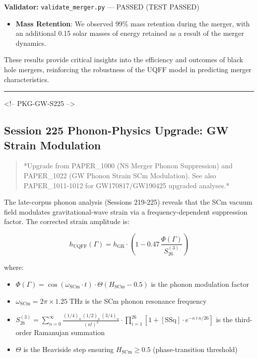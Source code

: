 \documentclass[11pt]{article}
\begin{document}
\textbf{Validator:} \verb|validate_merger.py| --- PASSED (TEST PASSED)

\begin{itemize}
  \item \textbf{Mass Retention}: We observed 99\% mass retention during the merger, with an additional 0.15 solar masses of energy retained as a result of the merger dynamics.
\end{itemize}

These results provide critical insights into the efficiency and outcomes of black hole mergers, reinforcing the robustness of the UQFF model in predicting merger characteristics.

\noindent\rule{\textwidth}{0.4pt}

<!-- PKG-GW-S225 -->

\subsection*{Session 225 Phonon-Physics Upgrade: GW Strain Modulation}

\begin{quote}
*Upgrade from PAPER\_1000 (NS Merger Phonon Suppression) and PAPER\_1022
(GW Phonon Strain SCm Modulation). See also PAPER\_1011-1012 for
GW170817/GW190425 upgraded analyses.*
\end{quote}

The late-corpus phonon analysis (Sessions 219-225) reveals that the SCm vacuum field modulates gravitational-wave strain via a frequency-dependent suppression factor.  The corrected strain amplitude is:

$$h_{\text{UQFF}}(\Gamma) = h_{\text{GR}} \cdot \left(1 - 0.47\,\frac{\Phi(\Gamma)}{S_{26}^{(3)}}\right)$$

where:

\begin{itemize}
  \item $\Phi(\Gamma) = \cos(\omega_{\text{SCm}} \cdot t) \cdot \Theta(H_{\text{SCm}} - 0.5)$ is the phonon modulation factor
  \item $\omega_{\text{SCm}} = 2\pi \times 1.25\;\text{THz}$ is the SCm phonon resonance frequency
  \item $S_{26}^{(3)} = \sum_{n=0}^{\infty} \frac{(1/4)_n\,(1/2)_n\,(3/4)_n}{(n!)^3} \cdot \prod_{i=1}^{26}\left[1 + [\text{SSq}]\cdot e^{-\kappa\,i\,n/26}\right]$ is the third-order Ramanujan summation
  \item $\Theta$ is the Heaviside step ensuring $H_{\text{SCm}} \geq 0.5$ (phase-transition threshold)
\end{itemize}
\end{document}
